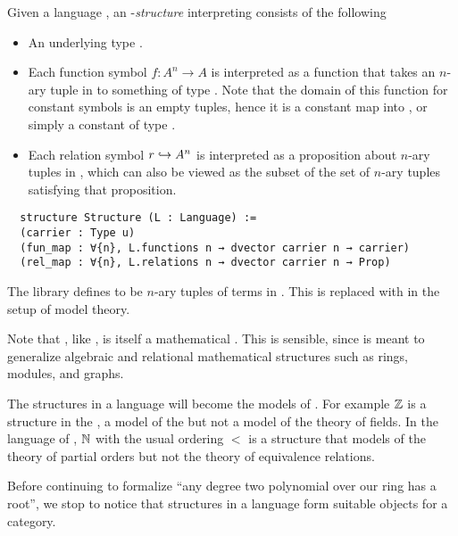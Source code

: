 \begin{dfn}[Structures]
    Given a language , an -\textit{structure} 
    interpreting  consists of the following
    \begin{itemize}
      \item An underlying type .
      \item Each function symbol $f : A^{n} \to A$ is interpreted as a
            function that takes an $n$-ary tuple in 
            to something of type .
            Note that the domain of this function for constant symbols is an empty tuples,
            hence it is a constant map into ,
            or simply a constant of type .
      \item Each relation symbol $r \hookrightarrow A^{n}$
            is interpreted as a proposition about $n$-ary tuples in ,
            which can also be viewed as the subset of the set of $n$-ary tuples
            satisfying that proposition.
    \end{itemize}

  \begin{lstlisting}
  structure Structure (L : Language) :=
  (carrier : Type u)
  (fun_map : ∀{n}, L.functions n → dvector carrier n → carrier)
  (rel_map : ∀{n}, L.relations n → dvector carrier n → Prop)\end{lstlisting}

  The  library defines  to be
  $n$-ary tuples of terms in .
  This is replaced with  in the  setup of model theory.

  Note that , like ,
  is itself a mathematical .
  This is sensible, since  is meant to generalize algebraic
  and relational mathematical structures such as rings, modules, and graphs.
\end{dfn}

The structures in a language will become the models of .
For example $\mathbb{Z}$ is a structure in the ,
a model of the  but not a model of the theory of fields.
In the language of ,
$\mathbb{N}$ with the usual ordering $<$ is a structure that models of
the theory of partial orders but not the theory of equivalence relations.

Before continuing to formalize ``any degree two polynomial over our ring has a root'',
we stop to notice that structures in a language form suitable objects for a category.


